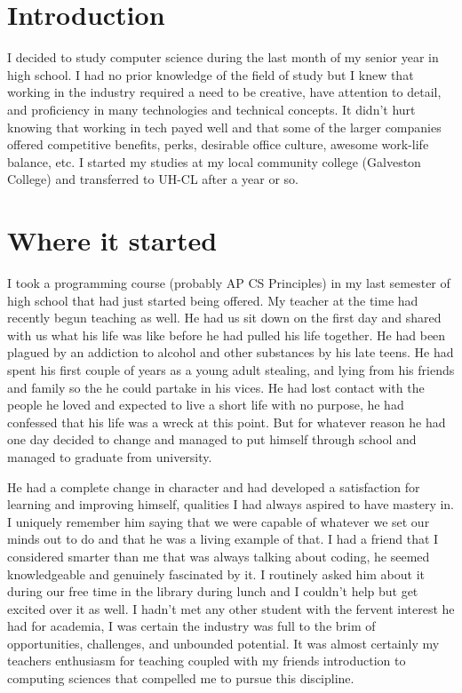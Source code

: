 \documentclass[notitlepage,a4paper,oneside,article,table]{article}
\begin{document}
\fi

\section{Introduction}
I decided to study computer science during the last month of my senior year in high school. I had no prior knowledge of the field of study but I knew that working in the industry required a need to be creative, have attention to detail, and proficiency in many technologies and technical concepts. It didn't hurt knowing that working in tech payed well and that some of the larger companies offered competitive benefits, perks, desirable office culture, awesome work-life balance, etc. I started my studies at my local community college (Galveston College) and transferred to UH-CL after a year or so. 

\section{Where it started}
I took a programming course (probably AP CS Principles) in my last semester of high school that had just started being offered. My teacher at the time had recently begun teaching as well. He had us sit down on the first day and shared with us what his life was like before he had pulled his life together. He had been plagued by an addiction to alcohol and other substances by his late teens. He had spent his first couple of years as a young adult stealing, and lying from his friends and family so the he could partake in his vices. He had lost contact with the people he loved and expected to live a short life with no purpose, he had confessed that his life was a wreck at this point. But for whatever reason he had one day decided to change and managed to put himself through school and managed to graduate from university. 
\vspace{0.5cm}

He had a complete change in character and had developed a satisfaction for learning and improving himself, qualities I had always aspired to have mastery in. I uniquely remember him saying that we were capable of whatever we set our minds out to do and that he was a living example of that. I had a friend that I considered smarter than me that was always talking about coding, he seemed knowledgeable and genuinely fascinated by it. I routinely asked him about it during our free time in the library during lunch and I couldn't help but get excited over it as well. I hadn't met any other student with the fervent interest he had for academia, I was certain the industry was full to the brim of opportunities, challenges, and unbounded potential. It was almost certainly my teachers enthusiasm for teaching coupled with my friends introduction to computing sciences that compelled me to pursue this discipline.  
\end{document}
